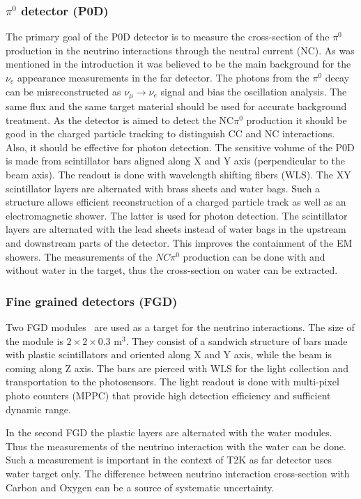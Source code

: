 \documentclass[../main.tex]{subfiles}
\begin{document}
\subsubsection{$\pi^0$ detector (P0D)}
\label{sec:t2k:pod}
The primary goal of the P0D detector is to measure the cross-section of the $\pi^0$ production in the neutrino interactions through the neutral current (NC). As was mentioned in the introduction it was believed to be the main background for the $\nu_e$ appearance measurements in the far detector. The photons from the $\pi^0$ decay can be misreconstructed as $\nu_\mu\to\nu_e$ signal and bias the oscillation analysis. The same flux and the same target material should be used for accurate background treatment. As the detector is aimed to detect the NC$\pi^0$ production it should be good in the charged particle tracking to distinguish CC and NC interactions. Also, it should be effective for photon detection. The sensitive volume of the P0D is made from scintillator bars aligned along X and Y axis (perpendicular to the beam axis). The readout is done with wavelength shifting fibers (WLS). The XY scintillator layers are alternated with brass sheets and water bags. Such a structure allows efficient reconstruction of a charged particle track as well as an electromagnetic shower. The latter is used for photon detection. The scintillator layers are alternated with the lead sheets instead of water bags in the upstream and downstream parts of the detector. This improves the containment of the EM showers. The measurements of the $NC\pi^0$ production can be done with and without water in the target, thus the cross-section on water can be extracted.

\subsubsection{Fine grained detectors (FGD)}
Two FGD modules~\cite{Amaudruz2012} are used as a target for the neutrino interactions. The size of the module is $2\times2\times0.3$ $\text{m}^3$. They consist of a sandwich structure of bars made with plastic scintillators and oriented along X and Y axis, while the beam is coming along Z axis. The bars are pierced with WLS for the light collection and transportation to the photosensors. The light readout is done with multi-pixel photo counters (MPPC) that provide high detection efficiency and sufficient dynamic range.

In the second FGD the plastic layers are alternated with the water modules. Thus the measurements of the neutrino interaction with the water can be done. Such a measurement is important in the context of T2K as far detector uses water target only. The difference between neutrino interaction cross-section with Carbon and Oxygen can be a source of systematic uncertainty.
\end{document}
